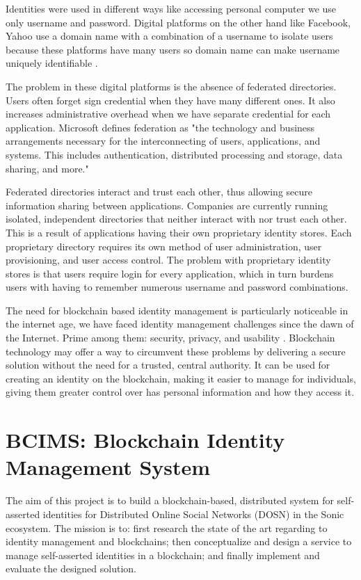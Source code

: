 Identities were used in different ways like accessing personal computer we use only username and password. Digital platforms on the other hand like Facebook, Yahoo use a domain name with a combination of a username to isolate users because these platforms have many users so domain name can make username uniquely identifiable \cite{gondor2016distributed}.

The problem in these digital platforms is the absence of federated directories. Users often forget sign credential when they have many different ones. It also increases administrative overhead when we have separate credential for each application. Microsoft defines federation as "the technology and business arrangements necessary for the interconnecting of users, applications, and systems. This includes
authentication, distributed processing and storage, data sharing, and more." \cite{IdentityManagement}

Federated directories interact and trust each other, thus allowing secure information sharing between applications. Companies are currently running isolated, independent directories that neither interact with nor trust each other.
This is a result of applications having their own proprietary identity stores. Each proprietary directory requires its own method of user administration, user provisioning, and user access control. The problem with proprietary identity stores is that users require login for every application, which in turn burdens users with having to remember numerous username and password combinations.

The need for blockchain based identity management is particularly noticeable in the internet age, we have faced identity management challenges since the dawn of the Internet. Prime among them: security, privacy, and usability \cite{Blockchain}.
Blockchain technology may offer a way to circumvent these problems by delivering a secure solution without the need for a trusted, central authority. It can be used for creating an identity on the blockchain, making it easier to manage for individuals, giving them greater control over has personal information and how they access it.

\section{BCIMS: Blockchain Identity Management System}
The aim of this project is to build a blockchain-based, distributed system for self-asserted identities for Distributed Online Social Networks (DOSN) in the Sonic ecosystem. The mission is to:  first research the state of the art regarding to identity management and blockchains; then conceptualize and design a service to manage self-asserted identities in a blockchain; and finally implement and evaluate the designed solution.


